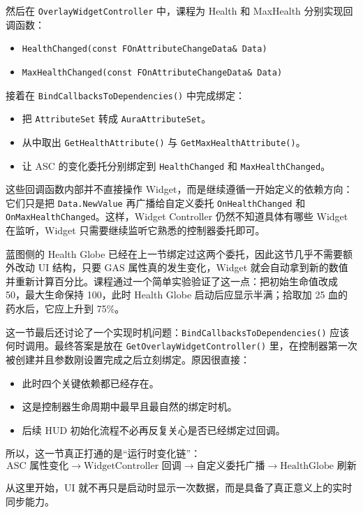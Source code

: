 然后在 \texttt{OverlayWidgetController} 中，课程为 Health 和 MaxHealth 分别实现回调函数：
\begin{itemize}
	\item \texttt{HealthChanged(const FOnAttributeChangeData\& Data)}
	\item \texttt{MaxHealthChanged(const FOnAttributeChangeData\& Data)}
\end{itemize}

接着在 \texttt{BindCallbacksToDependencies()} 中完成绑定：
\begin{itemize}
	\item 把 \texttt{AttributeSet} 转成 \texttt{AuraAttributeSet}。
	\item 从中取出 \texttt{GetHealthAttribute()} 与 \texttt{GetMaxHealthAttribute()}。
	\item 让 ASC 的变化委托分别绑定到 \texttt{HealthChanged} 和 \texttt{MaxHealthChanged}。
\end{itemize}

这些回调函数内部并不直接操作 Widget，而是继续遵循一开始定义的依赖方向：它们只是把 \texttt{Data.NewValue} 再广播给自定义委托 \texttt{OnHealthChanged} 和 \texttt{OnMaxHealthChanged}。这样，Widget Controller 仍然不知道具体有哪些 Widget 在监听，Widget 只需要继续监听它熟悉的控制器委托即可。

蓝图侧的 Health Globe 已经在上一节绑定过这两个委托，因此这节几乎不需要额外改动 UI 结构，只要 GAS 属性真的发生变化，Widget 就会自动拿到新的数值并重新计算百分比。课程通过一个简单实验验证了这一点：把初始生命值改成 50，最大生命保持 100，此时 Health Globe 启动后应显示半满；拾取加 25 血的药水后，它应上升到 75\%。

这一节最后还讨论了一个实现时机问题：\texttt{BindCallbacksToDependencies()} 应该何时调用。最终答案是放在 \texttt{GetOverlayWidgetController()} 里，在控制器第一次被创建并且参数刚设置完成之后立刻绑定。原因很直接：
\begin{itemize}
	\item 此时四个关键依赖都已经存在。
	\item 这是控制器生命周期中最早且最自然的绑定时机。
	\item 后续 HUD 初始化流程不必再反复关心是否已经绑定过回调。
\end{itemize}

所以，这一节真正打通的是“运行时变化链”：
\[
\text{ASC 属性变化} \rightarrow \text{WidgetController 回调} \rightarrow \text{自定义委托广播} \rightarrow \text{HealthGlobe 刷新}
\]

从这里开始，UI 就不再只是启动时显示一次数据，而是具备了真正意义上的实时同步能力。

